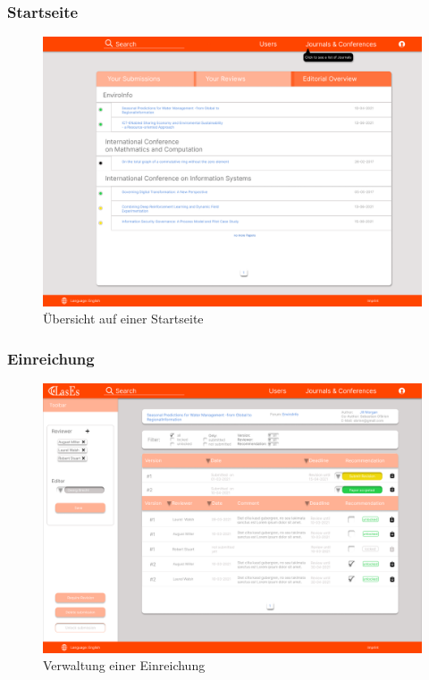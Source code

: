 \subsubsection{Startseite}

\begin{figure}[H]
	\centering
	\includegraphics[width=0.85\linewidth]{graphics/Homepage-png}
	\caption{Übersicht auf einer Startseite}
	\label{fig:homepageMockup}
\end{figure}

\subsubsection{Einreichung}

\begin{figure}[H]
	\centering
	\includegraphics[width=0.85\linewidth]{graphics/Submission-png}
	\caption{Verwaltung einer Einreichung}
	\label{fig:einreichung}
\end{figure}